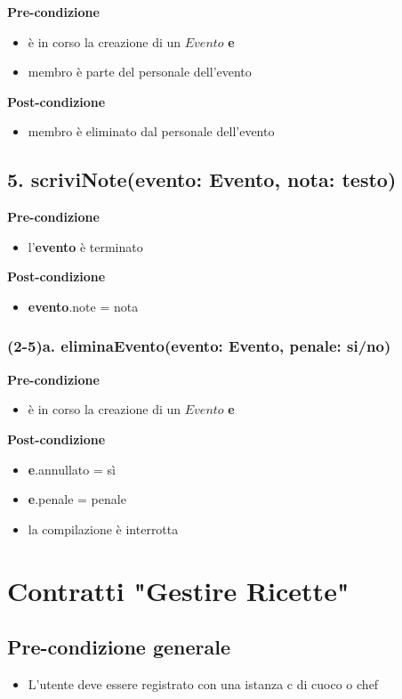 \documentclass[14pt]{extarticle}
\begin{document}
\textbf{Pre-condizione}
\begin{itemize}
  \item è in corso la creazione di un $Evento$ \textbf{e}
  \item membro è parte del personale dell'evento
\end{itemize}
\textbf{Post-condizione}
\begin{itemize}
  \item membro è eliminato dal personale dell'evento
\end{itemize}


\subsection*{5. scriviNote(evento: Evento, nota: testo)}

\textbf{Pre-condizione}
\begin{itemize}
  \item l'\textbf{evento} è terminato
\end{itemize}
\textbf{Post-condizione}
\begin{itemize}
  \item \textbf{evento}.note = nota
\end{itemize}


\subsubsection*{(2-5)a. eliminaEvento(evento: Evento, penale: si/no)}

\textbf{Pre-condizione}
\begin{itemize}
  \item è in corso la creazione di un $Evento$ \textbf{e}
\end{itemize}
\textbf{Post-condizione}
\begin{itemize}
  \item \textbf{e}.annullato = sì
  \item \textbf{e}.penale = penale
  \item la compilazione è interrotta
\end{itemize}  


\section{Contratti "Gestire Ricette"}

\subsection*{Pre-condizione generale}
\begin{itemize}
  \item L'utente deve essere registrato con una istanza c di cuoco o chef
\end{itemize}
\end{document}
